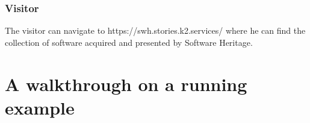 \documentclass[]{article}
\begin{document}
\hypertarget{visitor}{%
\subsubsection{\texorpdfstring{\textbf{Visitor}}{Visitor}}\label{visitor}}

The visitor can navigate to https://swh.stories.k2.services/ where he
can find the collection of software acquired and presented by Software
Heritage.

\hypertarget{sec:walkthrough}{%
\section{A walkthrough on a running example}\label{sec:walkthrough}}

\printbibliography[title=Bibliography]
\end{document}
